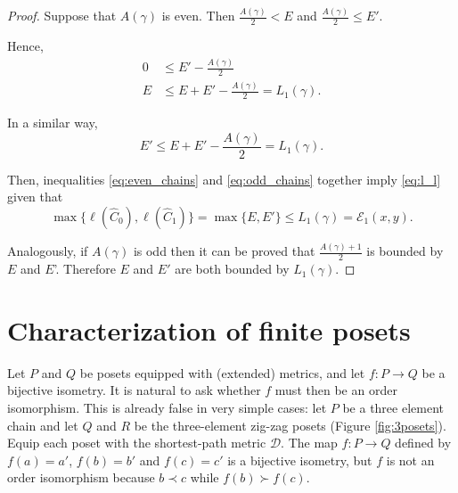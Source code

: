 \documentclass{article}[12pt]
\theoremstyle{exampstyle}
\theoremstyle{remark}
\newcommand{\D}{\mathcal{D}}
\newcommand{\E}{\mathcal{E}}
\begin{document}
\begin{proof}
Suppose that $A(\gamma)$ is even. Then $\frac{A(\gamma)}{2} < E$ and $\frac{A(\gamma)}{2} \leq E'$. 

Hence,
\begin{align}
    0 & \leq  E' - \frac{A(\gamma)}{2} \nonumber\\
    E & \leq E + E'- \frac{A(\gamma)}{2} = L_1(\gamma).
    \label{eq:even_chains}
\end{align}

In a similar way,
\begin{equation}
    E' \leq E + E'- \frac{A(\gamma)}{2} = L_1(\gamma).
    \label{eq:odd_chains}
\end{equation}
    
Then, inequalities \eqref{eq:even_chains}  and \eqref{eq:odd_chains} together imply \eqref{eq:l_l} given that
\[ \max\{\ell(\hat{C}_0) , \ell(\hat{C}_1)\} = \max\{ E, E'  \} \leq L_1(\gamma) = \E_1(x,y). \]

Analogously, if $A(\gamma)$ is odd then it can be proved that $\frac{A(\gamma)+1}{2}$ is bounded by $E$ and $E$'. Therefore $E$ and $E'$ are both bounded by $L_1(\gamma)$.

\end{proof}







\section{Characterization of finite posets}
\label{Sec:characterization}



Let $P$ and $Q$ be posets equipped with (extended) metrics, and let $f: P \to Q$ be a bijective isometry. It is natural to ask whether $f$ must then be an order isomorphism. This is already false in very simple cases: let $P$ be a three element chain and let $Q$ and $R$  be the three-element zig-zag posets (Figure \ref{fig:3posets}). Equip each poset with the shortest-path metric $\D$. The map $f:P \to Q$ defined by $f(a) = a'$, $f(b) = b' $ and $f(c) = c' $ is a bijective isometry, but $f$ is not an order isomorphism because $b \prec c$ while $f(b) \succ f(c)$. 
\end{document}

